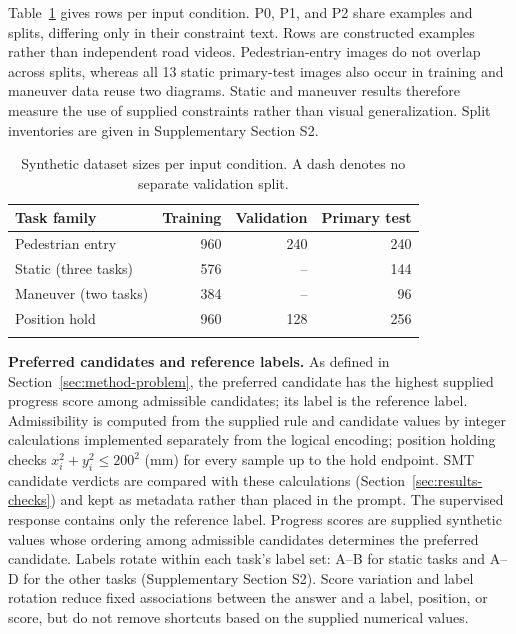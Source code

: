 Table~\ref{tab:setup-dataset-sizes} gives rows per input condition. P0, P1, and
P2 share examples and splits, differing only in their constraint text. Rows are
constructed examples rather than independent road videos. Pedestrian-entry
images do not overlap across splits, whereas all 13 static primary-test images
also occur in training and maneuver data reuse two diagrams. Static and
maneuver results therefore measure the use of supplied constraints rather than
visual generalization. Split inventories are given in Supplementary Section S2.

\begin{table}[tbp]
\caption{Synthetic dataset sizes per input condition. A dash denotes no
separate validation split.}\label{tab:setup-dataset-sizes}
\centering
\small
\begin{tabular*}{\textwidth}{@{\extracolsep\fill}lrrr@{}}
\toprule
Task family & Training & Validation & Primary test\\
\midrule
Pedestrian entry & 960 & 240 & 240\\
Static (three tasks) & 576 & -- & 144\\
Maneuver (two tasks) & 384 & -- & 96\\
Position hold & 960 & 128 & 256\\
\botrule
\end{tabular*}
\end{table}

\noindent\textbf{Preferred candidates and reference labels.}
As defined in Section~\ref{sec:method-problem}, the preferred candidate has the
highest supplied progress score among admissible candidates; its label is the
reference label. Admissibility is computed from the
supplied rule and candidate values by integer calculations implemented
separately from the logical encoding; position holding checks
$x_i^2+y_i^2\le 200^2$ (mm) for every sample up to the hold endpoint. SMT
candidate verdicts are compared with these calculations
(Section~\ref{sec:results-checks}) and kept as metadata rather than placed in
the prompt. The
supervised response contains only the reference label. Progress scores are
supplied synthetic values whose ordering among admissible candidates
determines the preferred candidate. Labels rotate within each task's label
set: A--B for static tasks and A--D for the other tasks (Supplementary Section S2). Score variation and label rotation reduce fixed
associations between the answer and a label, position, or score, but do not
remove shortcuts based on the supplied numerical values.


